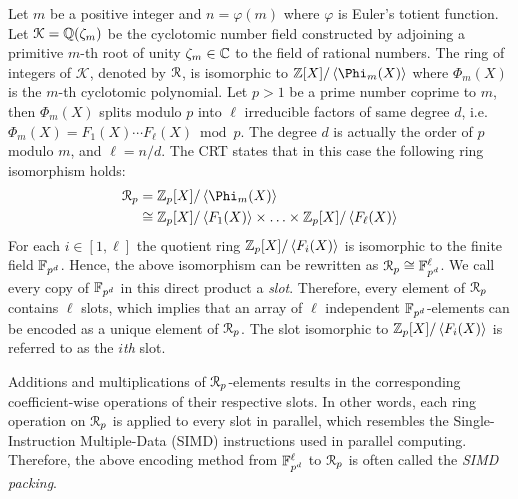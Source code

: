 Let $m$ be a positive integer and $n = \varphi(m)$ where $\varphi$ is Euler's totient function. 
Let $\mathcal{K} = \mathbb{Q}(\zeta_{m})$ be the cyclotomic number field constructed by adjoining a primitive $m$-th root of unity $\zeta_{m}\in\mathbb{C}$ to the field of rational numbers. 
The ring of integers of $\mathcal{K}$, denoted by $\mathcal{R}$, is isomorphic to $\Z[X]/\ideal{\Phi_m(X)}$ where $\Phi_m(X)$ is the $m$-th cyclotomic polynomial. 
Let $p>1$ be a prime number coprime to $m$, then $\Phi_m(X)$ splits modulo $p$ into $\ell$ irreducible factors of same degree $d$, i.e. $\Phi_m(X) = F_1(X)\cdots F_\ell(X) \bmod p$. 
The degree $d$ is actually the order of $p$ modulo $m$, and $\ell = n/d$. 
The \ac{CRT} states that in this case the following ring isomorphism holds:
\begin{align*}
  \intring_p &= \Z_p[X]/\ideal{\Phi_m(X)} \nonumber \\ 
  & \cong \Z_p[X]/\ideal{F_1(X)} \times \ldots \times \Z_p[X]/\ideal{F_{\ell}(X)}
\end{align*}
For each $i \in [1,\ell]$ the quotient ring $\mathbb{Z}_p[X]/\left\langle F_i(X) \right\rangle$ is isomorphic to the finite field $\mathbb{F}_{p^d}$. 
Hence, the above isomorphism can be rewritten as $\mathcal{R}_p \cong \mathbb{F}_{p^d}^\ell$.
We call every copy of $\mathbb{F}_{p^d}$ in this direct product a \emph{slot}. 
Therefore, every element of $\mathcal{R}_p$ contains $\ell$ slots, which implies that an array of $\ell$ independent $\mathbb{F}_{p^d}$-elements can be encoded as a unique element of $\mathcal{R}_p$. 
The slot isomorphic to $\mathbb{Z}_p[X]/\left\langle F_i(X) \right\rangle$ is referred to as the \emph{$i$th} slot.

Additions and multiplications of $\mathcal{R}_p$-elements results in the corresponding coefficient-wise operations of their respective slots. 
In other words, each ring operation on $\mathcal{R}_p$ is applied to every slot in parallel, which resembles the Single-Instruction Multiple-Data (SIMD) instructions used in parallel computing.
Therefore, the above encoding method from $\mathbb{F}_{p^d}^\ell$ to $\mathcal{R}_p$ is often called the \emph{SIMD packing}.


